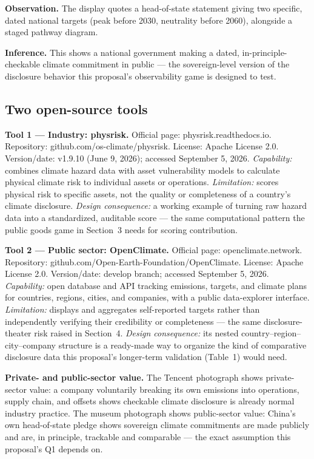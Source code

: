 \textbf{Observation.} The display quotes a head-of-state statement giving two specific, dated national targets (peak before 2030, neutrality before 2060), alongside a staged pathway diagram.

\textbf{Inference.} This shows a national government making a dated, in-principle-checkable climate commitment in public --- the sovereign-level version of the disclosure behavior this proposal's observability game is designed to test.

\subsection*{Two open-source tools}
\textbf{Tool 1 --- Industry: physrisk.} Official page: physrisk.readthedocs.io. Repository: github.com/os-climate/physrisk. License: Apache License 2.0. Version/date: v1.9.10 (June 9, 2026); accessed September 5, 2026. \emph{Capability:} combines climate hazard data with asset vulnerability models to calculate physical climate risk to individual assets or operations. \emph{Limitation:} scores physical risk to specific assets, not the quality or completeness of a country's climate disclosure. \emph{Design consequence:} a working example of turning raw hazard data into a standardized, auditable score --- the same computational pattern the public goods game in Section~3 needs for scoring contribution.

\textbf{Tool 2 --- Public sector: OpenClimate.} Official page: openclimate.network. Repository: github.com/Open-Earth-Foundation/OpenClimate. License: Apache License 2.0. Version/date: develop branch; accessed September 5, 2026. \emph{Capability:} open database and API tracking emissions, targets, and climate plans for countries, regions, cities, and companies, with a public data-explorer interface. \emph{Limitation:} displays and aggregates self-reported targets rather than independently verifying their credibility or completeness --- the same disclosure-theater risk raised in Section~4. \emph{Design consequence:} its nested country--region--city--company structure is a ready-made way to organize the kind of comparative disclosure data this proposal's longer-term validation (Table~1) would need.

\textbf{Private- and public-sector value.} The Tencent photograph shows private-sector value: a company voluntarily breaking its own emissions into operations, supply chain, and offsets shows checkable climate disclosure is already normal industry practice. The museum photograph shows public-sector value: China's own head-of-state pledge shows sovereign climate commitments are made publicly and are, in principle, trackable and comparable --- the exact assumption this proposal's Q1 depends on.

